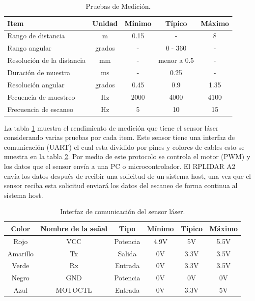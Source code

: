 \begin{table}[htbp]
\begin{center}
\begin{tabular}{|l|c|c|c|c|}
\hline
Item & Unidad & M\'inimo & T\'ipico & M\'aximo\\
\hline \hline
Rango de distancia & m & 0.15 & - & 8 \\ \hline
Rango angular & grados & - & 0 - 360 & - \\ \hline
Resoluci\'on de la distancia & mm & - & menor a 0.5 & - \\ \hline
Duraci\'on de muestra & ms & - & 0.25 & - \\ \hline
Resoluci\'on angular & grados & 0.45 & 0.9 & 1.35 \\ \hline
Fecuencia de muestreo & Hz & 2000 & 4000 & 4100 \\ \hline
Frecuencia de escaneo & Hz & 5 & 10 & 15 \\ \hline
\end{tabular}
\caption{Pruebas de Medici\'on.}
\label{tbl:medicion}
\end{center}
\end{table}

La tabla \ref{tbl:medicion} muestra el rendimiento de medici\'on \cite{Slamtec} 
que tiene el sensor l\'aser considerando varias pruebas por cada item. Este 
sensor tiene una interfaz de comunicaci\'on (UART) el cual esta dividido por 
pines y colores de cables esto se muestra en la tabla \ref{tbl:comunicacion}. Por 
medio de este protocolo se controla el motor (PWM) y los datos que el sensor 
env\'ia a una PC o microcontrolador. El RPLIDAR A2 env\'ia los datos despu\'es de 
recibir una solicitud de un sistema host, una vez que el sensor reciba esta 
solicitud enviar\'a los datos del escaneo de forma continua al sistema host.
\begin{table}[htbp]
\begin{center}
\begin{tabular}{|c|c|c|c|c|c|}
\hline
Color & Nombre de la se\~nal & Tipo & M\'inimo & T\'ipico & M\'aximo \\ 
\hline \hline
Rojo & VCC & Potencia & 4.9V & 5V & 5.5V \\ \hline
Amarillo & Tx & Salida & 0V & 3.3V & 3.5V \\ \hline
Verde & Rx & Entrada & 0V & 3.3V & 3.5V \\ \hline
Negro & GND & Potencia & 0V & 0V & 0V \\ \hline
Azul & MOTOCTL & Entrada & 0V & 3.3V & 5V \\ \hline
\end{tabular}
\caption{Interfaz de comunicaci\'on del sensor l\'aser.}
\label{tbl:comunicacion}
\end{center}
\end{table}


